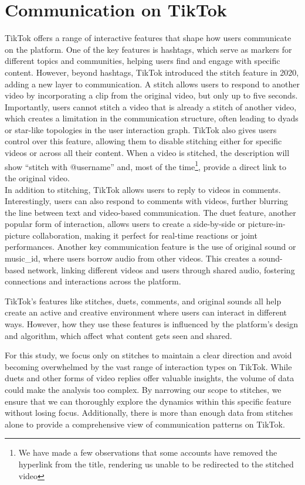 \section{Communication on TikTok}
TikTok offers a range of interactive features that shape how users communicate on the platform. One of the key features is hashtags, which serve as markers for different topics and communities, helping users find and engage with specific content. However, beyond hashtags, TikTok introduced the stitch feature in 2020, adding a new layer to communication. A stitch allows users to respond to another video by incorporating a clip from the original video, but only up to five seconds. Importantly, users cannot stitch a video that is already a stitch of another video, which creates a limitation in the communication structure, often leading to dyads or star-like topologies in the user interaction graph. TikTok also gives users control over this feature, allowing them to disable stitching either for specific videos or across all their content. When a video is stitched, the description will show “stitch with @username” and, most of the time\footnote{We have made a few observations that some accounts have removed the hyperlink from the title, rendering us unable to be redirected to the stitched video}, provide a direct link to the original video. \\

In addition to stitching, TikTok allows users to reply to videos in comments. Interestingly, users can also respond to comments with videos, further blurring the line between text and video-based communication. The duet feature, another popular form of interaction, allows users to create a side-by-side or picture-in-picture collaboration, making it perfect for real-time reactions or joint performances. Another key communication feature is the use of original sound or music\_id, where users borrow audio from other videos\citep{tiktok_features}. This creates a sound-based network, linking different videos and users through shared audio, fostering connections and interactions across the platform.

TikTok’s features like stitches, duets, comments, and original sounds all help create an active and creative environment where users can interact in different ways. However, how they use these features is influenced by the platform’s design and algorithm, which affect what content gets seen and shared.

For this study, we focus only on stitches to maintain a clear direction and avoid becoming overwhelmed by the vast range of interaction types on TikTok. While duets and other forms of video replies offer valuable insights, the volume of data could make the analysis too complex. By narrowing our scope to stitches, we ensure that we can thoroughly explore the dynamics within this specific feature without losing focus. Additionally, there is more than enough data from stitches alone to provide a comprehensive view of communication patterns on TikTok. 

